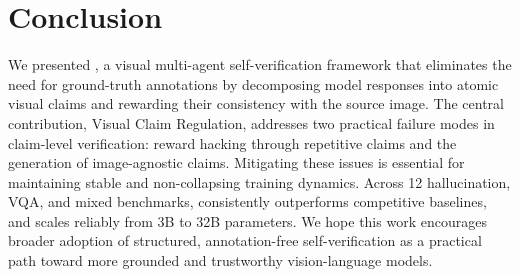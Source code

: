 
\section{Conclusion}
\label{sec:conclusion}
We presented \ours, a visual multi-agent self-verification framework that eliminates the need for ground-truth annotations by decomposing model responses into atomic visual claims and rewarding their consistency with the source image.
The central contribution, Visual Claim Regulation, addresses two practical failure modes in claim-level verification: reward hacking through repetitive claims and the generation of image-agnostic claims. Mitigating these issues is essential for maintaining stable and non-collapsing training dynamics.
Across 12 hallucination, VQA, and mixed benchmarks, \ours consistently outperforms competitive baselines, and scales reliably from 3B to 32B parameters.
We hope this work encourages broader adoption of structured, annotation-free self-verification as a practical path toward more grounded and trustworthy vision-language models.



